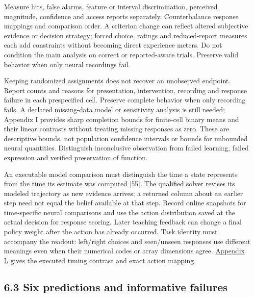 \documentclass[
  american,
  11pt,
  letterpaper,
]{article}
\begin{document}
Measure hits, false alarms, feature or interval discrimination, perceived magnitude, confidence and access reports separately. Counterbalance response mappings and comparison order. A criterion change can reflect altered subjective evidence or decision strategy; forced choice, ratings and reduced-report measures each add constraints without becoming direct experience meters. Do not condition the main analysis on correct or reported-aware trials. Preserve valid behavior when only neural recordings fail.

Keeping randomized assignments does not recover an unobserved endpoint. Report counts and reasons for presentation, intervention, recording and response failure in each prespecified cell. Preserve complete behavior when only recording fails. A declared missing-data model or sensitivity analysis is still needed; Appendix I provides sharp completion bounds for finite-cell binary means and their linear contrasts without treating missing responses as zero. These are descriptive bounds, not population confidence intervals or bounds for unbounded neural quantities. Distinguish inconclusive observation from failed learning, failed expression and verified preservation of function.

An executable model comparison must distinguish the time a state represents from the time its estimate was computed {[}55{]}. The qualified solver revises its modeled trajectory as new evidence arrives; a returned column about an earlier step need not equal the belief available at that step. Record online snapshots for time-specific neural comparisons and use the action distribution saved at the actual decision for response scoring. Later teaching feedback can change a final policy weight after the action has already occurred. Task identity must accompany the readout: left/right choices and seen/unseen responses use different meanings even when their numerical codes or array dimensions agree. \href{https://zenodo.org/records/23455801/files/Learning-to-Feel-Technical-Supplement-v1.1.pdf\#appendix-l}{Appendix L} gives the executed timing contrast and exact action mapping.

\subsection{6.3 Six predictions and informative failures}\label{six-predictions-and-informative-failures}
\end{document}

